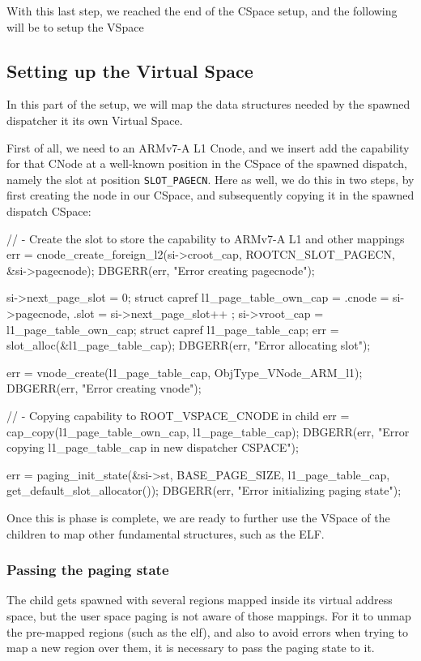 \documentclass[a4paper,twoside,openright]{report}
\begin{document}
With this last step, we reached the end of the CSpace setup, and the following will be to setup the VSpace

\subsection{Setting up the Virtual Space}
In this part of the setup, we will map the data structures needed by the spawned dispatcher it its own Virtual Space.

First of all, we need to an ARMv7-A L1 Cnode, and we insert add the capability for that CNode at a well-known position in the CSpace of the spawned dispatch, namely the slot at position \texttt{SLOT\_PAGECN}.
Here as well, we do this in two steps, by first creating the node in our CSpace, and subsequently copying it in the spawned dispatch CSpace:
\begin{pandacode}
    // - Create the slot to store the capability to ARMv7-A L1 and other mappings
    err = cnode_create_foreign_l2(si->croot_cap, ROOTCN_SLOT_PAGECN, &si->pagecnode);
    DBGERR(err, "Error creating pagecnode\n");

    si->next_page_slot = 0;
    struct capref l1_page_table_own_cap = {
        .cnode = si->pagecnode,
        .slot = si->next_page_slot++
    };
    si->vroot_cap = l1_page_table_own_cap;
    struct capref l1_page_table_cap;
    err = slot_alloc(&l1_page_table_cap);
    DBGERR(err, "Error allocating slot\n");

    err = vnode_create(l1_page_table_cap, ObjType_VNode_ARM_l1);
    DBGERR(err, "Error creating vnode\n");

    // - Copying capability to ROOT_VSPACE_CNODE in child
    err = cap_copy(l1_page_table_own_cap, l1_page_table_cap);
    DBGERR(err, "Error copying l1_page_table_cap in new dispatcher CSPACE\n");

    err = paging_init_state(&si->st, BASE_PAGE_SIZE, 
            l1_page_table_cap, get_default_slot_allocator());
    DBGERR(err, "Error initializing paging state\n");
\end{pandacode} 

Once this is phase is complete, we are ready to further use the VSpace of the children to map other fundamental structures, such as the ELF.

\subsubsection{Passing the paging state}
The child gets spawned with several regions mapped inside its virtual address space, but the user space paging is not aware of those mappings. For it to unmap the pre-mapped regions (such as the elf), and also to avoid errors when trying to map a new region over them, it is necessary to pass the paging state to it.
\end{document}
